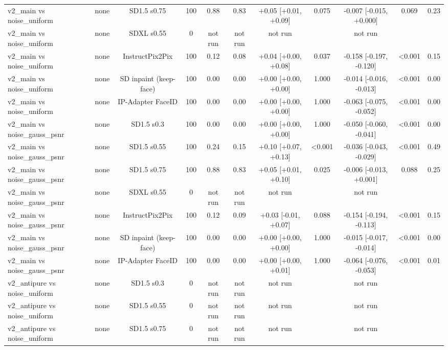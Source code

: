 \begin{table}[t]
{\begin{tabular}{lcccccccccc}
v2\_main vs noise\_uniform & none & SD1.5 s0.75 & 100 & 0.88 & 0.83 & +0.05 [+0.01, +0.09] & 0.075 & -0.007 [-0.015, +0.000] & 0.069 & 0.23 \\
v2\_main vs noise\_uniform & none & SDXL s0.55 & 0 & not run & not run & not run &  & not run &  &  \\
v2\_main vs noise\_uniform & none & InstructPix2Pix & 100 & 0.12 & 0.08 & +0.04 [+0.00, +0.08] & 0.037 & -0.158 [-0.197, -0.120] & <0.001 & 0.15 \\
v2\_main vs noise\_uniform & none & SD inpaint (keep-face) & 100 & 0.00 & 0.00 & +0.00 [+0.00, +0.00] & 1.000 & -0.014 [-0.016, -0.013] & <0.001 & 0.00 \\
v2\_main vs noise\_uniform & none & IP-Adapter FaceID & 100 & 0.00 & 0.00 & +0.00 [+0.00, +0.00] & 1.000 & -0.063 [-0.075, -0.052] & <0.001 & 0.00 \\
v2\_main vs noise\_gauss\_psnr & none & SD1.5 s0.3 & 100 & 0.00 & 0.00 & +0.00 [+0.00, +0.00] & 1.000 & -0.050 [-0.060, -0.041] & <0.001 & 0.00 \\
v2\_main vs noise\_gauss\_psnr & none & SD1.5 s0.55 & 100 & 0.24 & 0.15 & +0.10 [+0.07, +0.13] & <0.001 & -0.036 [-0.043, -0.029] & <0.001 & 0.49 \\
v2\_main vs noise\_gauss\_psnr & none & SD1.5 s0.75 & 100 & 0.88 & 0.83 & +0.05 [+0.01, +0.10] & 0.025 & -0.006 [-0.013, +0.001] & 0.088 & 0.25 \\
v2\_main vs noise\_gauss\_psnr & none & SDXL s0.55 & 0 & not run & not run & not run &  & not run &  &  \\
v2\_main vs noise\_gauss\_psnr & none & InstructPix2Pix & 100 & 0.12 & 0.09 & +0.03 [-0.01, +0.07] & 0.088 & -0.154 [-0.194, -0.113] & <0.001 & 0.15 \\
v2\_main vs noise\_gauss\_psnr & none & SD inpaint (keep-face) & 100 & 0.00 & 0.00 & +0.00 [+0.00, +0.00] & 1.000 & -0.015 [-0.017, -0.014] & <0.001 & 0.00 \\
v2\_main vs noise\_gauss\_psnr & none & IP-Adapter FaceID & 100 & 0.00 & 0.00 & +0.00 [+0.00, +0.01] & 1.000 & -0.064 [-0.076, -0.053] & <0.001 & 0.01 \\
v2\_antipure vs noise\_uniform & none & SD1.5 s0.3 & 0 & not run & not run & not run &  & not run &  &  \\
v2\_antipure vs noise\_uniform & none & SD1.5 s0.55 & 0 & not run & not run & not run &  & not run &  &  \\
v2\_antipure vs noise\_uniform & none & SD1.5 s0.75 & 0 & not run & not run & not run &  & not run &  &  \\

\end{tabular}}
\end{table}
